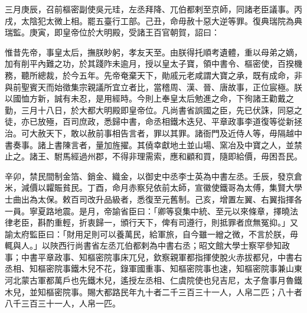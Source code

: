 \begin{pinyinscope}
 三月庚辰，召前樞密副使吳元珪，左丞拜降、兀伯都剌至京師，同諸老臣議事。丙戌，太陰犯太微上相。罷五臺行工部。己丑，命毋赦十惡大逆等罪。復典瑞院為典瑞監。庚寅，即皇帝位於大明殿，受諸王百官朝賀，詔曰：



 惟昔先帝，事皇太后，撫朕眇躬，孝友天至。由朕得托順考遺體，重以母弟之嫡，加有削平內難之功，於其踐阼未逾月，授以皇太子寶，領中書令、樞密使，百揆機務，聽所總裁，於今五年。先帝奄棄天下，勛戚元老咸謂大寶之承，既有成命，非與前聖賓天而始徵集宗親議所宜立者比，當稽周、漢、晉、唐故事，正位宸極。朕以國恤方新，誠有未忍，是用經時。今則上奉皇太后勉進之命，下徇諸王勸戴之勤，三月十八日，於大都大明殿即皇帝位。凡尚書省誤國之臣，先已伏誅，同惡之徒，亦已放殛，百司庶政，悉歸中書，命丞相鐵木迭兒、平章政事李道復等從新拯治。可大赦天下，敢以赦前事相告言者，罪以其罪。諸衙門及近侍人等，毋隔越中書奏事。諸上書陳言者，量加旌擢。其僥幸獻地土並山場、窯冶及中寶之人，並禁止之。諸王、駙馬經過州郡，不得非理需索，應和顧和買，隨即給價，毋困吾民。



 辛卯，禁民間制金箔、銷金、織金，以御史中丞李士英為中書左丞。壬辰，發京倉米，減價以糶賑貧民。丁酉，命月赤察兒依前太師，宣徽使鐵哥為太傅，集賢大學士曲出為太保。敕百司改升品級者，悉復至元舊制。己亥，增置左翼、右翼指揮各一員。寧夏路地震。是月，帝諭省臣曰：「卿等裒集中統、至元以來條章，擇曉法律老臣，斟酌重輕，折衷歸一，頒行天下，俾有司遵行，則抵罪者庶無冤抑。」又諭太府監臣曰：「財用足則可以養萬民，給軍旅，自今雖一繒之微，不言於朕，毋輒與人。」以陜西行尚書省左丞兀伯都剌為中書右丞；昭文館大學士察罕參知政事；中書平章政事、知樞密院事床兀兒，欽察親軍都指揮使脫火赤拔都兒，中書右丞相、知樞密院事鐵木兒不花，錄軍國重事、知樞密院事也速，知樞密院事兼山東河北蒙古軍都萬戶也先鐵木兒，遙授左丞相、仁虞院使也兒吉尼，太子詹事月魯鐵木兒，並知樞密院事。賜大都路民年九十者二千三百三十一人，人帛二匹；八十者八千三百三十一人，人帛一匹。




\end{pinyinscope}
